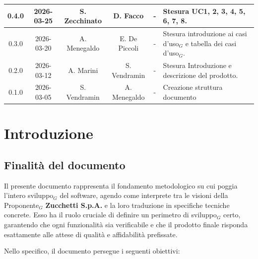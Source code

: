 \documentclass[a4paper, 10pt]{article}
\begin{document}
\begin{longtable}{|c|c|c|c|c|p{3cm}|}
    0.4.0 & 2026-03-25 & S. Zecchinato & D. Facco & - & Stesura UC1, 2, 3, 4, 5, 6, 7, 8. \\ \hline

    0.3.0 & 2026-03-20 & A. Menegaldo & E. De Piccoli & - & Stesura introduzione ai casi d'uso$_G$ e tabella dei casi d'uso$_G$. \\ \hline

    0.2.0 & 2026-03-12 & A. Marini & S. Vendramin & - & Stesura Introduzione e descrizione del prodotto. \\ \hline

    0.1.0 & 2026-03-05 & S. Vendramin & A. Menegaldo & - & Creazione struttura documento \\ \hline

\end{longtable}
\endgroup

\newpage

\tableofcontents
\newpage

\listoffigures
\newpage

\section{Introduzione}

\subsection{Finalità del documento}
Il presente documento rappresenta il fondamento metodologico su cui poggia l'intero sviluppo$_G$ del software, agendo come interprete tra le visioni della Proponente$_G$ \textbf{Zucchetti S.p.A.} e la loro traduzione in specifiche tecniche concrete. Esso ha il ruolo cruciale di definire un perimetro di sviluppo$_G$ certo, garantendo che ogni funzionalità sia verificabile e che il prodotto finale risponda esattamente alle attese di qualità e affidabilità prefissate.

Nello specifico, il documento persegue i seguenti obiettivi:
\end{document}
